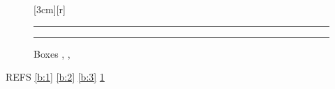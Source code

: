 \documentclass{article}
\begin{document}
\begin{figure}[h]
\centering
{}\quad
{}[3cm][r]{\rule{2cm}{1cm}}\quad
\begin{minipage}{3cm}\centering\rule{2cm}{1cm}\label{b:3}\end{minipage}
\caption{Boxes , , }\label{b:main}
\end{figure}
REFS \ref{b:1} \ref{b:2} \ref{b:3}  \ref{b:main}
\end{document}
